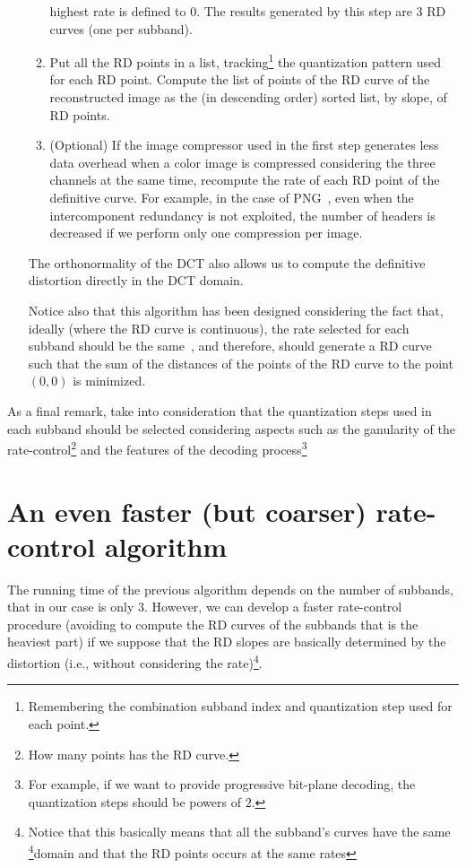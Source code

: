 \begin{enumerate}
\begin{enumerate}
    highest rate is defined to $0$.  The results generated by this
    step are $3$ RD curves (one per subband).
  \item Put all the RD points in a list, tracking\footnote{Remembering
  the combination subband index and quantization step used for each
  point.} the quantization pattern used for each RD point. Compute the
    list of points of the RD curve of the reconstructed image as the
    (in descending order) sorted list, by slope, of RD points.
  \item (Optional) If the image compressor used in the first step
    generates less data overhead when a color image is compressed
    considering the three channels at the same time, recompute the
    rate of each RD point of the definitive curve. For example, in the
    case of PNG~\cite{vruiz__PNG}, even when the intercomponent
    redundancy is not exploited, the number of headers is decreased if
    we perform only one compression per image.
  \end{enumerate}

  The orthonormality of the DCT also allows us to compute the
  definitive distortion directly in the DCT domain.

  Notice also that this algorithm has been designed considering the
  fact that, ideally (where the RD curve is continuous), the rate
  selected for each subband should be the
  same~\cite{vruiz__information_theory,vetterli2014foundations}, and
  therefore, should generate a RD curve such that the sum of the
  distances of the points of the RD curve to the point $(0,0)$ is
  minimized.
  
\end{enumerate}

As a final remark, take into consideration that the quantization steps
used in each subband should be selected considering aspects such as
the ganularity of the rate-control\footnote{How many points has the RD
curve.} and the features of the decoding process\footnote{For example, if we
want to provide progressive bit-plane decoding, the quantization steps
should be powers of $2$.}

\section{An even faster (but coarser) rate-control algorithm}

The running time of the previous algorithm depends on the number of
subbands, that in our case is only $3$. However, we can develop a
faster rate-control procedure (avoiding to compute the RD curves of
the subbands that is the heaviest part) if we suppose that the RD
slopes are basically determined by the distortion (i.e., without
considering the rate)\footnote{Notice that this basically means that
all the subband's curves have the
same \footnote{https://en.wikipedia.org/wiki/Domain_of_a_function}{domain}
and that the RD points occurs at the same rates}.

